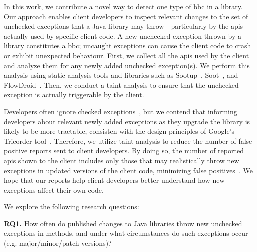 In this work, we contribute a novel way to detect one type of \gls{bbc} in a library.
Our approach enables client developers to inspect relevant changes to the set of
unchecked exceptions that a Java library may throw—particularly by the \gls{api}s
actually used by specific client code. A new unchecked exception thrown by a library
constitutes a \gls{bbc}; uncaught exceptions can cause the client code to crash or
exhibit unexpected behaviour. First, we collect all the \gls{api}s used by the client
and analyze them for any newly added unchecked exception(s). We perform this analysis
using static analysis tools and libraries such as Sootup~\cite{Karakaya24:_sootup},
Soot~\cite{vallee2010soot}, and FlowDroid~\cite{Arzt14:_flowdroid}. Then, we conduct
a taint analysis to ensure that the unchecked exception is actually triggerable by
the client.


Developers often ignore checked exceptions~\cite{nakshatri16:_analy_java}, but we
contend that informing developers about relevant newly added exceptions as they upgrade
the library is likely to be more tractable, consisten with the design principles
of Google’s Tricorder tool~\cite{sadowski15:_tricor}. Therefore, we utilize taint
analysis to reduce the number of false positive reports sent to client developers.
By doing so, the number of reported \gls{api}s shown to the client includes only
those that may realistically throw new exceptions in updated versions of the client
code, minimizing false positives~\cite{pashchenko20:_vuln4}.
We hope that our reports help client developers better understand how new exceptions
affect their own code.

We explore the following research questions:

\noindent
{\bf RQ1.} How often do published changes to Java libraries throw new unchecked exceptions in methods,
and under what circumstances do such exceptions occur (e.g. major/minor/patch versions)?

